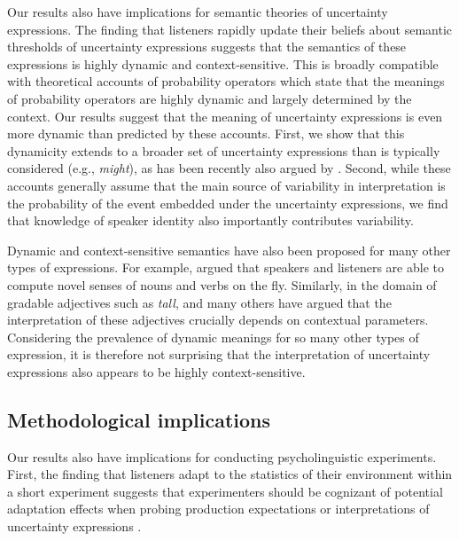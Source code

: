 \documentclass[man, floatsintext]{apa6}
\begin{document}
Our results also have implications for semantic theories of uncertainty expressions.
The finding that listeners rapidly update their beliefs about semantic thresholds of uncertainty expressions
suggests that the semantics of these expressions is highly dynamic and context-sensitive. This is broadly compatible with 
theoretical accounts of probability operators \parencite[a subset of uncertainty expressions; e.g.,][]{Yalcin2010} which 
state that the meanings of probability operators are highly dynamic and largely determined by the context. Our results
suggest that the meaning of uncertainty expressions is even more dynamic than predicted by these accounts. First, we show that this dynamicity 
extends to a broader set of uncertainty expressions than is typically considered (e.g., \textit{might}), as has been recently also argued by \textcite{Lassiter2016}. 
Second, while these accounts generally assume 
that the main source of variability in interpretation is the probability of the event
embedded under the uncertainty expressions, we find that knowledge of speaker identity also  importantly contributes variability.

Dynamic and context-sensitive semantics have also been proposed for many other types of expressions.
For example, \textcite{Clark1983} argued that speakers and listeners
are able to compute novel senses of nouns and verbs on the fly. Similarly, in the domain of gradable adjectives such as \textit{tall},
 \textcite{Kennedy2007} and many others have argued that the interpretation of these adjectives crucially depends on contextual
 parameters. Considering the prevalence of dynamic meanings for so many other types of expression, it is therefore not 
 surprising that the interpretation of uncertainty expressions also appears to be highly context-sensitive.
 
\subsection{Methodological implications}

Our results also have implications for conducting psycholinguistic experiments. First,
the finding that listeners adapt to the statistics of their environment within a short experiment
suggests that experimenters should be cognizant of potential adaptation effects when probing
production expectations or interpretations of uncertainty expressions \parencite[see also][]{Jaeger2010}. 
\end{document}

